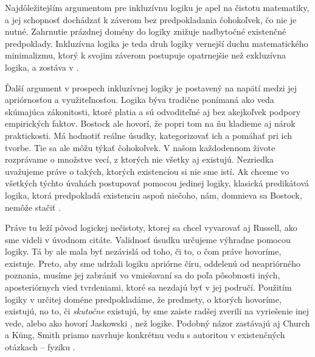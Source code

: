 \documentclass[12pt, letterpaper]{article}
\begin{document}
Najdôležitejším argumentom pre inkluzívnu logiku je apel na čistotu matematiky, a jej schopnosť dochádzať k záverom bez predpokladania čohokoľvek, čo nie je nutné. Zahrnutie prázdnej domény do logiky znižuje nadbytočné existenčné predpoklady. Inkluzívna logika je teda druh logiky vernejší duchu matematického minimalizmu, ktorý k svojim záverom postupuje opatrnejšie než exkluzívna logika, a zostáva v  \parencites[]{sep-quantification}.\par

Ďalší argument v prospech inkluzívnej logiky je postavený na napätí medzi jej apriórnosťou a využiteľnosťou. Logika býva tradične ponímaná ako veda skúmajúca zákonitosti, ktoré platia a sú odvoditeľné aj bez akejkoľvek podpory empirických faktov. Bostock ale hovorí, že popri tom na ňu kladieme aj nárok praktickosti. Má hodnotiť reálne úsudky, kategorizovať ich a pomáhať pri ich tvorbe. Tie sa ale môžu týkať čohokoľvek. V našom každodennom živote rozprávame o množstve vecí, z ktorých nie všetky aj existujú. Nezriedka uvažujeme práve o takých, ktorých existenciou si nie sme istí. Ak chceme vo všetkých týchto úvahách postupovať pomocou jedinej logiky, klasická predikátová logika, ktorá predpokladá existenciu aspoň niečoho, nám, domnieva sa Bostock, nemôže stačiť \parencites[351--352]{bostock_intermediate_1997}.\par

Práve tu leží pôvod logickej nečistoty, ktorej sa chcel vyvarovať aj Russell, ako sme videli v úvodnom citáte. Validnosť úsudku určujeme výhradne pomocou logiky. Tá by ale mala byť nezávislá od toho, či to, o čom práve hovoríme, existuje. Preto, aby sme udržali logiku apriórne číru, oddelenú od neapriórného poznania, musíme jej zabrániť vo vmiešavaní sa do poľa pôsobnosti iných, aposteriórnych vied tvrdeniami, ktoré sa nezdajú byť v jej područí. Použitím logiky v určitej doméne predpokladáme, že predmety, o ktorých hovoríme, existujú, no to, či \textit{skutočne} existujú, by sme zaiste radšej zverili na vyriešenie inej vede, alebo ako hovorí Jaskowski , než logike. Podobný názor zastávajú aj Church a Küng, Smith priamo navrhuje konkrétnu vedu s autoritou v existenčných otázkach -- fyziku \parencites[1013]{Church}[254--255]{jaskowski}[254--255]{Guido}[203]{russell_introduction_1993}[331]{Smith2020}.\par 
\end{document}
